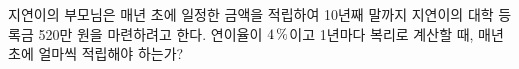 지연이의 부모님은 매년 초에 일정한 금액을 적립하여 10년째 말까지 지연이의 대학 등록금 520만 원을 마련하려고 한다. 연이율이 $4\mkern3mu \%$이고 1년마다 복리로 계산할 때, 매년 초에 얼마씩 적립해야 하는가? 
